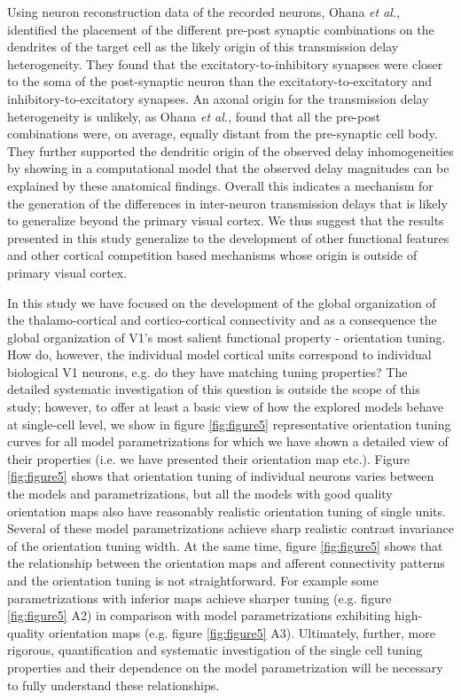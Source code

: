 \documentclass[utf8]{frontiersSCNS}
\newcommand{\etal}{\textit{et al.}}
\begin{document}
Using neuron reconstruction data of the recorded neurons, Ohana \etal,\citep{Ohana2012} identified the 
placement of the different pre-post synaptic combinations on the dendrites of the target cell as the likely origin of this 
transmission delay heterogeneity. They found that the excitatory-to-inhibitory synapses were closer to the soma
of the post-synaptic neuron than the excitatory-to-excitatory and inhibitory-to-excitatory synapses. An axonal origin 
for the transmission delay heterogeneity is unlikely, as Ohana \etal,\citep{Ohana2012} found that all the pre-post combinations were, on
average, equally distant from the pre-synaptic cell body. They further supported the dendritic origin of the observed
delay inhomogeneities by showing in a computational model that the observed delay magnitudes can be explained by
these anatomical findings. Overall this indicates a mechanism for the generation of the differences in 
inter-neuron transmission delays that is likely to generalize beyond the primary visual cortex. We thus suggest that the
results presented in this study generalize to the development of other functional features and other 
cortical competition based mechanisms whose origin is outside of primary visual cortex.

In this study we have focused on the development of the global organization of the thalamo-cortical and cortico-cortical connectivity and 
as a consequence the global organization of V1's most salient functional property - orientation tuning. How do, however, the individual model
cortical units correspond to individual biological V1 neurons, e.g. do they have matching tuning properties? The detailed systematic investigation 
of this question is outside the scope of this study; however, to offer at least a basic view of how the explored models behave at single-cell
level, we show in figure \ref{fig:figure5} representative orientation tuning curves for all model parametrizations for which we have shown a 
detailed view of their properties (i.e. we have presented their orientation map etc.). Figure \ref{fig:figure5} shows that orientation tuning of individual neurons  varies between the models and parametrizations, but all the models with good quality orientation maps also have reasonably realistic orientation tuning of single units. Several of these model parametrizations achieve sharp realistic contrast invariance of the orientation tuning width. At the same time, figure \ref{fig:figure5} shows that the relationship between the orientation maps and afferent connectivity patterns and the orientation tuning is not straightforward. For example some parametrizations with inferior maps achieve sharper tuning (e.g. figure \ref{fig:figure5} A2) in comparison with model parametrizations exhibiting high-quality orientation maps (e.g. figure \ref{fig:figure5} A3). Ultimately, further, more rigorous, quantification and systematic investigation of the single cell tuning properties and their dependence on the model parametrization will be necessary to fully understand these relationships.
\end{document}
